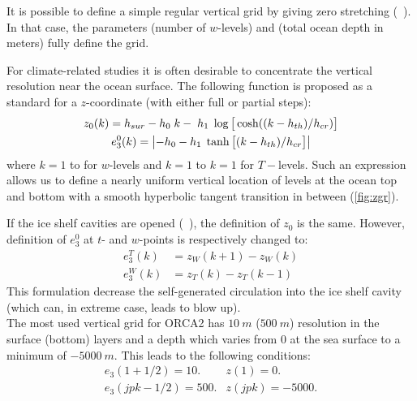 \documentclass[../main/NEMO_manual]{subfiles}
\begin{document}
It is possible to define a simple regular vertical grid by giving zero stretching (~).
In that case, the parameters  (number of $w$-levels) and
 (total ocean depth in meters) fully define the grid.

For climate-related studies it is often desirable to concentrate the vertical resolution near the ocean surface.
The following function is proposed as a standard for a $z$-coordinate (with either full or partial steps): 
\begin{gather}
  \label{eq:DOM_zgr_ana_1}
    z_0  (k) = h_{sur} - h_0 \; k - \; h_1 \; \log  \big[ \cosh ((k - h_{th}) / h_{cr}) \big] \\
    e_3^0(k) = \left|    - h_0      -    h_1 \; \tanh \big[        (k - h_{th}) / h_{cr}  \big] \right|
\end{gather}
where $k = 1$ to  for $w$-levels and $k = 1$ to $k = 1$ for $T-$levels.
Such an expression allows us to define a nearly uniform vertical location of levels at the ocean top and bottom with
a smooth hyperbolic tangent transition in between (\autoref{fig:zgr}).

If the ice shelf cavities are opened (~), the definition of $z_0$ is the same.
However, definition of $e_3^0$ at $t$- and $w$-points is respectively changed to:
\begin{equation}
  \label{eq:DOM_zgr_ana_2}
  \begin{split}
    e_3^T(k) &= z_W (k + 1) - z_W (k    ) \\
    e_3^W(k) &= z_T (k    ) - z_T (k - 1)
  \end{split}
\end{equation}
This formulation decrease the self-generated circulation into the ice shelf cavity 
(which can, in extreme case, leads to blow up).\\
 
The most used vertical grid for ORCA2 has $10~m$ ($500~m$) resolution in the surface (bottom) layers and
a depth which varies from 0 at the sea surface to a minimum of $-5000~m$.
This leads to the following conditions:
\begin{equation}
  \label{eq:DOM_zgr_coef}
  \begin{array}{ll}
    e_3 (1   + 1/2) =  10. & z(1  ) =     0. \\
    e_3 (jpk - 1/2) = 500. & z(jpk) = -5000.
  \end{array}
\end{equation}
\end{document}
